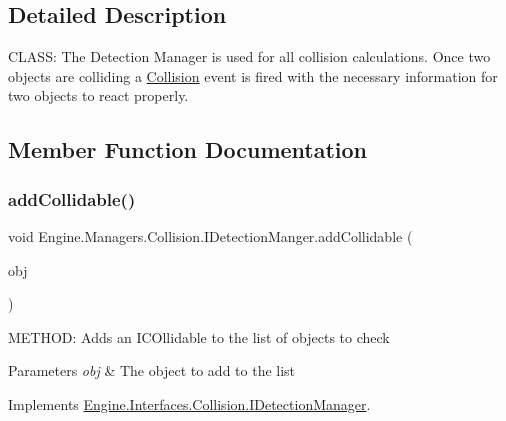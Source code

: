 \subsection{Detailed Description}
C\+L\+A\+SS\+: The Detection Manager is used for all collision calculations. Once two objects are colliding a \hyperlink{a00268}{Collision} event is fired with the necessary information for two objects to react properly. 



\subsection{Member Function Documentation}
\mbox{\label{a00502_ae4daf9d957c8b30e779a7ed89237b370}} 
\subsubsection{\texorpdfstring{add\+Collidable()}{addCollidable()}}
{\footnotesize\ttfamily void Engine.\+Managers.\+Collision.\+I\+Detection\+Manger.\+add\+Collidable (\begin{DoxyParamCaption}\item[{\hyperlink{a00426}{I\+Collidable}}]{obj }\end{DoxyParamCaption})\hspace{0.3cm}{\ttfamily [inline]}}



M\+E\+T\+H\+OD\+: Adds an I\+C\+Ollidable to the list of objects to check 


\begin{DoxyParams}{Parameters}
{\em obj} & The object to add to the list\\
\hline
\end{DoxyParams}


Implements \hyperlink{a00430_a11808ec009ee682fa73e3c4ea6570139}{Engine.\+Interfaces.\+Collision.\+I\+Detection\+Manager}.

\mbox{\label{a00502_a272b97e8ab5caf3dcceb455849deb6ed}} 
